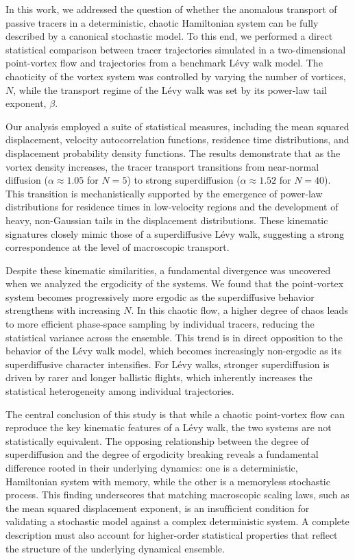 \documentclass[]{article}
\begin{document}
In this work, we addressed the question of whether the anomalous transport of passive tracers in a deterministic, chaotic Hamiltonian system can be fully described by a canonical stochastic model. To this end, we performed a direct statistical comparison between tracer trajectories simulated in a two-dimensional point-vortex flow and trajectories from a benchmark Lévy walk model. The chaoticity of the vortex system was controlled by varying the number of vortices, $N$, while the transport regime of the Lévy walk was set by its power-law tail exponent, $\beta$.

Our analysis employed a suite of statistical measures, including the mean squared displacement, velocity autocorrelation functions, residence time distributions, and displacement probability density functions. The results demonstrate that as the vortex density increases, the tracer transport transitions from near-normal diffusion ($\alpha \approx 1.05$ for $N=5$) to strong superdiffusion ($\alpha \approx 1.52$ for $N=40$). This transition is mechanistically supported by the emergence of power-law distributions for residence times in low-velocity regions and the development of heavy, non-Gaussian tails in the displacement distributions. These kinematic signatures closely mimic those of a superdiffusive Lévy walk, suggesting a strong correspondence at the level of macroscopic transport.

Despite these kinematic similarities, a fundamental divergence was uncovered when we analyzed the ergodicity of the systems. We found that the point-vortex system becomes progressively more ergodic as the superdiffusive behavior strengthens with increasing $N$. In this chaotic flow, a higher degree of chaos leads to more efficient phase-space sampling by individual tracers, reducing the statistical variance across the ensemble. This trend is in direct opposition to the behavior of the Lévy walk model, which becomes increasingly non-ergodic as its superdiffusive character intensifies. For Lévy walks, stronger superdiffusion is driven by rarer and longer ballistic flights, which inherently increases the statistical heterogeneity among individual trajectories.

The central conclusion of this study is that while a chaotic point-vortex flow can reproduce the key kinematic features of a Lévy walk, the two systems are not statistically equivalent. The opposing relationship between the degree of superdiffusion and the degree of ergodicity breaking reveals a fundamental difference rooted in their underlying dynamics: one is a deterministic, Hamiltonian system with memory, while the other is a memoryless stochastic process. This finding underscores that matching macroscopic scaling laws, such as the mean squared displacement exponent, is an insufficient condition for validating a stochastic model against a complex deterministic system. A complete description must also account for higher-order statistical properties that reflect the structure of the underlying dynamical ensemble.


{}

\end{document}
